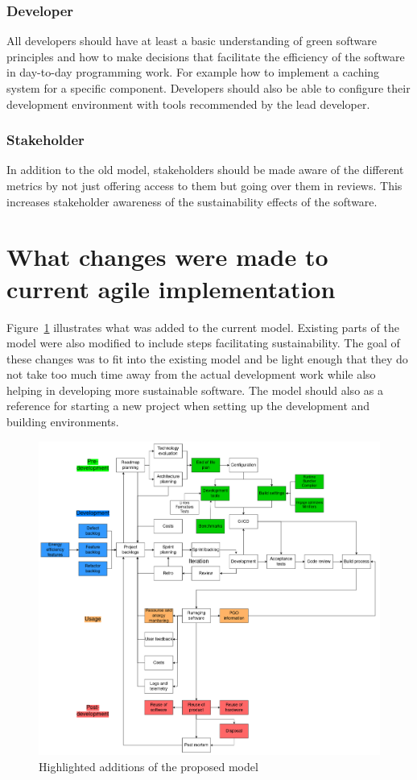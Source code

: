 \subsubsection{Developer}
All developers should have at least a basic understanding of green software principles and how to make decisions that facilitate the efficiency of the software in day-to-day programming work. For example how to implement a caching system for a specific component. Developers should also be able to configure their development environment with tools recommended by the lead developer.

\subsubsection{Stakeholder}
In addition to the old model, stakeholders should be made aware of the different metrics by not just offering access to them but going over them in reviews. This increases stakeholder awareness of the sustainability effects of the software.

\section{What changes were made to current agile implementation}
Figure~\ref{dev} illustrates what was added to the current model. Existing parts of the model were also modified to include steps facilitating sustainability. The goal of these changes was to fit into the existing model and be light enough that they do not take too much time away from the actual development work while also helping in developing more sustainable software. The model should also as a reference for starting a new project when setting up the development and building environments.

\begin{figure}[H]
\includegraphics[width=\textwidth]{images/highlighted.png}
\centering
\caption{Highlighted additions of the proposed model}
\label{dev}
\end{figure}